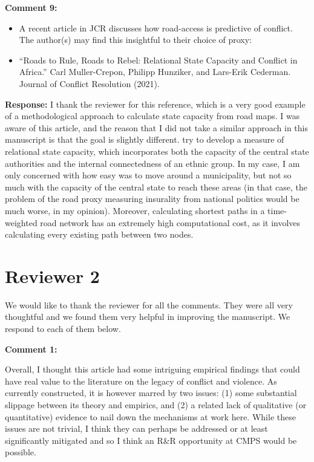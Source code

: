 \documentclass[12pt, a4paper, notitlepage]{article}
\begin{document}
\vspace{15pt}
\noindent\textbf{Comment 9:}
\begin{displayquote}
\begin{itemize}
\item A recent article in JCR discusses how road-access is predictive of conflict. The author(s) may find this insightful to their choice of proxy:
\item[] ``Roads to Rule, Roads to Rebel: Relational State Capacity and Conflict in Africa.'' Carl Muller-Crepon, Philipp Hunziker, and Lars-Erik Cederman. Journal of Conflict Resolution (2021).
\end{itemize}
\end{displayquote}

\noindent\textbf{Response:} I thank the reviewer for this reference, which is a very good example of a methodological approach to calculate state capacity from road maps. I was aware of this article, and the reason that I did not take a similar approach in this manuscript is that the goal is slightly different. \citet{Muller-Crepon:2021va} try to develop a measure of relational state capacity, which incorporates both the capacity of the central state authorities and the internal connectedness of an ethnic group. In my case, I am only concerned with how easy was to move around a municipality, but not so much with the capacity of the central state to reach these areas (in that case, the problem of the road proxy measuring insurality from national politics would be much worse, in my opinion). Moreover, calculating shortest paths in a time-weighted road network has an extremely high computational cost, as it involves calculating every existing path between two nodes.

\newpage
\section*{Reviewer 2}

\textbf{{\color{red}{CHANGE }}} We would like to thank the reviewer for all the comments. They were all very thoughtful and we found them very helpful in improving the manuscript. We respond to each of them below.

\vspace{15pt}
\noindent\textbf{Comment 1:}
\begin{displayquote}
Overall, I thought this article had some intriguing empirical findings that could have real value to the literature on the legacy of conflict and violence. As currently constructed, it is however marred by two issues: (1) some substantial slippage between its theory and empirics, and (2) a related lack of qualitative (or quantitative) evidence to nail down the mechanisms at work here. While these issues are not trivial, I think they can perhaps be addressed or at least significantly mitigated and so I think an R\&R opportunity at CMPS would be possible.
\end{displayquote}
\end{document}
